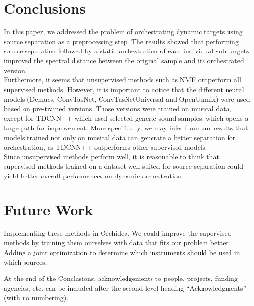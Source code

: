 \documentclass{article}
\begin{document}
	\section{Conclusions}\label{sec:conclusions}
	In this paper, we addressed the problem of orchestrating dynamic targets using source separation as a preprocessing step. The results showed that performing source separation followed by a static orchestration of each individual sub targets improved the spectral distance between the original sample and its orchestrated version.\\
	
	Furthermore, it seems that unsupervised methods such as NMF outperform all supervised methods. However, it is important to notice that the different neural models (Demucs, ConvTasNet, ConvTasNetUniversal and OpenUnmix) were used based on pre-trained versions. Those versions were trained on musical data, except for TDCNN++ which used selected generic sound samples, which opens a large path for improvement. More specifically, we may infer from our results that models trained not only on musical data can generate a better separation for orchestration, as TDCNN++ outperforms other supervised models.\\
	
	Since unsupervised methods perform well, it is reasonable to think that supervised methods trained on a dataset well suited for source separation could yield better overall performances on dynamic orchestration.
	
	\section{Future Work}\label{sec:futurework}
	Implementing these methods in Orchidea. We could improve the supervised methods by training them ourselves with data that fits our problem better. Adding a joint optimization to determine which instruments should be used in which sources.
	
	\begin{acknowledgments}
		At the end of the Conclusions, acknowledgements to people, projects, funding agencies, etc. can be included after the second-level heading  ``Acknowledgments'' (with no numbering).
	\end{acknowledgments} 
	
	
	
\end{document}

